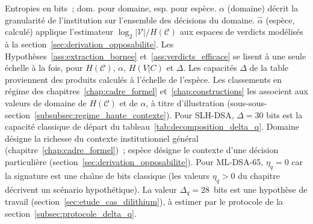 \begin{sloppypar}
\begin{table}[htbp]
\smallskip
\begin{minipage}{0.92\linewidth}\footnotesize
Entropies en bits~; \og dom.\fg{} pour domaine, \og esp.\fg{} pour esp\`ece. $\alpha$ (domaine) d\'ecrit la granularit\'e de l'institution sur l'ensemble des
d\'ecisions du domaine. $\hat\alpha$ (esp\`ece, calcul\'e) applique l'estimateur $\log_2|\mathcal{V}|/H(\mathcal{C})$ aux
espaces de verdicts mod\'elis\'es \`a la section~\ref{sec:derivation_opposabilite}. Les
Hypoth\`eses~\ref{ass:extraction_bornee} et~\ref{ass:verdicts_efficace} se lisent \`a une seule \'echelle
\`a la fois, pour $H(\mathcal{C})$, $\alpha$, $H(V|C)$ et $\Delta$. Les capacit\'es $\Delta$ de la table
proviennent des produits calcul\'es \`a l'\'echelle de l'esp\`ece. Les classements en r\'egime des
chapitres~\ref{chap:cadre_formel} et~\ref{chap:constructions} les associent aux valeurs de domaine de
$H(\mathcal{C})$ et de $\alpha$, \`a titre d'illustration
(sous-sous-section~\ref{subsubsec:regime_haute_contexte}). Pour SLH-DSA, $\Delta = 30$ bits est la
capacit\'e classique de d\'epart du tableau~\ref{tab:decomposition_delta_q}. \og Domaine\fg{} d\'esigne la richesse du contexte institutionnel
g\'en\'eral (chapitre~\ref{chap:cadre_formel})~; \og esp\`ece\fg{} d\'esigne le contexte d'une
d\'ecision particuli\`ere (section~\ref{sec:derivation_opposabilite}). Pour
ML-DSA-65, $\eta_q = 0$ car la signature est une cha\^{\i}ne de bits classique
(les valeurs $\eta_q > 0$ du chapitre d\'ecrivent un sc\'enario hypoth\'etique).
La valeur $\Delta_q = 28$~bits est une hypoth\`ese de travail
(section~\ref{sec:etude_cas_dilithium}), \`a estimer par le protocole de la
section~\ref{subsec:protocole_delta_q}.
\end{minipage}
\end{table}

\end{sloppypar}